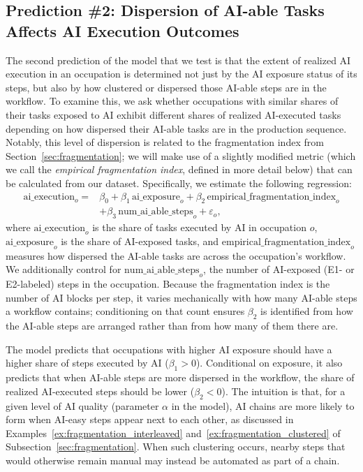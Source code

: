 \subsection{Prediction \#2: Dispersion of AI-able Tasks Affects AI Execution Outcomes}
\label{sec:fragmentation_prediction}

The second prediction of the model that we test is that the extent of realized AI execution in an occupation is determined not just by the AI exposure status of its steps, but also by how clustered or dispersed those AI-able steps are in the workflow.
To examine this, we ask whether occupations with similar shares of their tasks exposed to AI exhibit different shares of realized AI-executed tasks depending on how dispersed their AI-able tasks are in the production sequence.
Notably, this level of dispersion is related to the fragmentation index from Section~\ref{sec:fragmentation}; we will make use of a slightly modified metric (which we call the \emph{empirical fragmentation index}, defined in more detail below) that can be calculated from our dataset.
Specifically, we estimate the following regression:
\begin{equation}
\begin{aligned}
    \text{ai\_execution}_{o} = {} & \beta_0 + \beta_1 \, \text{ai\_exposure}_{o} + \beta_2 \, \text{empirical\_fragmentation\_index}_{o} \\
    & + \beta_3 \, \text{num\_ai\_able\_steps}_{o} + \varepsilon_o,
\end{aligned}
    \label{eq:fragmentation_index_regression}
\end{equation}
where \emph{$\text{ai\_execution}_{o}$} is the share of tasks executed by AI in occupation $o$, \emph{$\text{ai\_exposure}_{o}$} is the share of AI-exposed tasks, and \emph{$\text{empirical\_fragmentation\_index}_{o}$} measures how dispersed the AI-able tasks are across the occupation's workflow. We additionally control for \emph{$\text{num\_ai\_able\_steps}_{o}$}, the number of AI-exposed (E1- or E2-labeled) steps in the occupation. Because the fragmentation index is the number of AI blocks per step, it varies mechanically with how many AI-able steps a workflow contains; conditioning on that count ensures $\beta_2$ is identified from how the AI-able steps are arranged rather than from how many of them there are.

The model predicts that occupations with higher AI exposure should have a higher share of steps executed by AI ($\beta_1 > 0$).
Conditional on exposure, it also predicts that when AI-able steps are more dispersed in the workflow, the share of realized AI-executed steps should be lower ($\beta_2 < 0$).
The intuition is that, for a given level of AI quality (parameter $\alpha$ in the model), AI chains are more likely to form when AI-easy steps appear next to each other, as discussed in Examples~\ref{ex:fragmentation_interleaved} and~\ref{ex:fragmentation_clustered} of Subsection~\ref{sec:fragmentation}.
When such clustering occurs, nearby steps that would otherwise remain manual may instead be automated as part of a chain.

